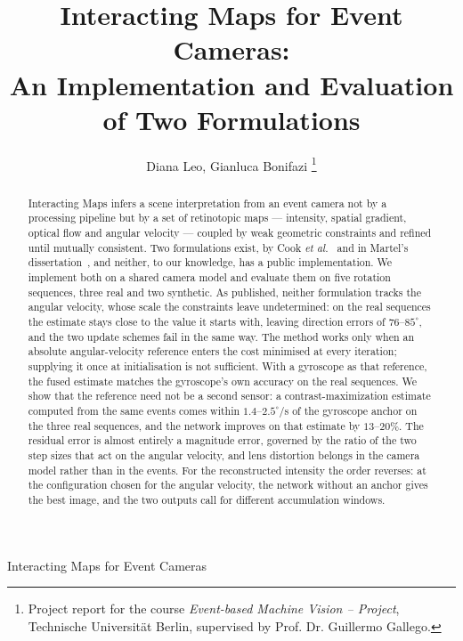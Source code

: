\documentclass[journal]{IEEEtran}
\begin{document}
\title{Interacting Maps for Event Cameras:\\
An Implementation and Evaluation of Two Formulations}

\author{Diana Leo, Gianluca Bonifazi%
\thanks{Project report for the course \emph{Event-based Machine Vision -- Project},
Technische Universit\"at Berlin, supervised by Prof. Dr. Guillermo Gallego.}}

%
{Interacting Maps for Event Cameras}

\maketitle

\begin{abstract}
Interacting Maps infers a scene interpretation from an event camera not by a processing pipeline but by a set of retinotopic maps --- intensity, spatial gradient, optical flow and angular velocity --- coupled by weak geometric constraints and refined until mutually consistent. Two formulations exist, by Cook \emph{et al.}~\cite{cook2011,martel2015relational} and in Martel's dissertation~\cite{martel2019thesis}, and neither, to our knowledge, has a public implementation. We implement both on a shared camera model and evaluate them on five rotation sequences, three real and two synthetic. As published, neither formulation tracks the angular velocity, whose scale the constraints leave undetermined: on the real sequences the estimate stays close to the value it starts with, leaving direction errors of $76$--$85^\circ$, and the two update schemes fail in the same way. The method works only when an absolute angular-velocity reference enters the cost minimised at every iteration; supplying it once at initialisation is not sufficient. With a gyroscope as that reference, the fused estimate matches the gyroscope's own accuracy on the real sequences. We show that the reference need not be a second sensor: a contrast-maximization estimate computed from the same events comes within $1.4$--$2.5^\circ$/s of the gyroscope anchor on the three real sequences, and the network improves on that estimate by $13$--$20\%$. The residual error is almost entirely a magnitude error, governed by the ratio of the two step sizes that act on the angular velocity, and lens distortion belongs in the camera model rather than in the events. For the reconstructed intensity the order reverses: at the configuration chosen for the angular velocity, the network without an anchor gives the best image, and the two outputs call for different accumulation windows.
\end{abstract}
\end{document}
